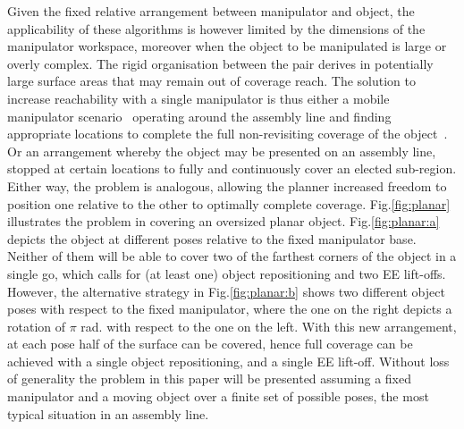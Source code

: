 \documentclass[letterpaper,journal]{IEEEtran}
\begin{document}
Given the fixed relative arrangement between manipulator and object, the applicability of these algorithms is however limited by the dimensions of the manipulator workspace, moreover when the object to be manipulated is large or overly complex. The rigid organisation between the pair derives in potentially large surface areas that may remain out of coverage reach. 
The solution to increase reachability with a single manipulator is thus either a mobile manipulator scenario~\cite{Atkar2003Towards} operating around the assembly line and finding appropriate locations to complete the full non-revisiting coverage of the object~\cite{paus2017a}. Or an arrangement whereby the  object may be presented on an assembly line, stopped at certain locations to fully and continuously cover an elected sub-region. Either way, the problem is analogous, allowing the planner increased freedom to position one relative to the other to optimally complete coverage. 
Fig.\ref{fig:planar} illustrates the problem in covering an oversized planar object. Fig.\ref{fig:planar:a} depicts the object at different poses relative to the fixed manipulator base. Neither of them will be able to cover two of the farthest corners of the object in a single go, which calls for (at least one) object repositioning and two EE lift-offs. However, the alternative strategy in Fig.\ref{fig:planar:b} shows two different object poses with respect to the fixed manipulator, where the one on the right depicts a rotation of $\pi$ rad. with respect to the one on the left. With this new arrangement, at each pose half of the surface can be covered, hence full coverage can be achieved with a single object repositioning, and a single EE lift-off. 
Without loss of generality the problem in this paper will be presented assuming a fixed manipulator and a moving object over a finite set of possible poses, the most typical situation in an assembly line. %
\end{document}
